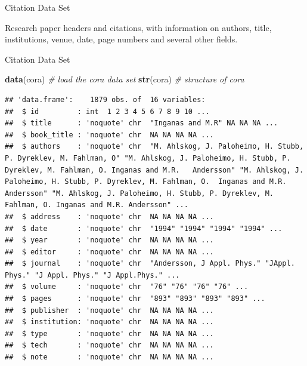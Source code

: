 \documentclass[
  ignorenonframetext,
]{beamer}
\newenvironment{Shaded}{\begin{snugshade}}{\end{snugshade}}
\newcommand{\CommentTok}[1]{\textcolor[rgb]{0.56,0.35,0.01}{\textit{#1}}}
\newcommand{\KeywordTok}[1]{\textcolor[rgb]{0.13,0.29,0.53}{\textbf{#1}}}
\newcommand{\NormalTok}[1]{#1}
\begin{document}
\begin{frame}{Citation Data Set}
\protect\hypertarget{citation-data-set}{}

Research paper headers and citations, with information on authors,
title, institutions, venue, date, page numbers and several other fields.

\end{frame}

\begin{frame}[fragile]{Citation Data Set}
\protect\hypertarget{citation-data-set-1}{}

\begin{Shaded}
\begin{Highlighting}[]
\KeywordTok{data}\NormalTok{(cora) }\CommentTok{# load the cora data set}
\KeywordTok{str}\NormalTok{(cora) }\CommentTok{# structure of cora}
\end{Highlighting}
\end{Shaded}

\begin{verbatim}
## 'data.frame':    1879 obs. of  16 variables:
##  $ id         : int  1 2 3 4 5 6 7 8 9 10 ...
##  $ title      : 'noquote' chr  "Inganas and M.R" NA NA NA ...
##  $ book_title : 'noquote' chr  NA NA NA NA ...
##  $ authors    : 'noquote' chr  "M. Ahlskog, J. Paloheimo, H. Stubb, P. Dyreklev, M. Fahlman, O" "M. Ahlskog, J. Paloheimo, H. Stubb, P. Dyreklev, M. Fahlman, O. Inganas and M.R.   Andersson" "M. Ahlskog, J. Paloheimo, H. Stubb, P. Dyreklev, M. Fahlman, O.  Inganas and M.R.  Andersson" "M. Ahlskog, J. Paloheimo, H. Stubb, P. Dyreklev, M. Fahlman, O. Inganas and M.R. Andersson" ...
##  $ address    : 'noquote' chr  NA NA NA NA ...
##  $ date       : 'noquote' chr  "1994" "1994" "1994" "1994" ...
##  $ year       : 'noquote' chr  NA NA NA NA ...
##  $ editor     : 'noquote' chr  NA NA NA NA ...
##  $ journal    : 'noquote' chr  "Andersson, J Appl. Phys." "JAppl. Phys." "J Appl. Phys." "J Appl.Phys." ...
##  $ volume     : 'noquote' chr  "76" "76" "76" "76" ...
##  $ pages      : 'noquote' chr  "893" "893" "893" "893" ...
##  $ publisher  : 'noquote' chr  NA NA NA NA ...
##  $ institution: 'noquote' chr  NA NA NA NA ...
##  $ type       : 'noquote' chr  NA NA NA NA ...
##  $ tech       : 'noquote' chr  NA NA NA NA ...
##  $ note       : 'noquote' chr  NA NA NA NA ...
\end{verbatim}

\end{frame}
\end{document}
